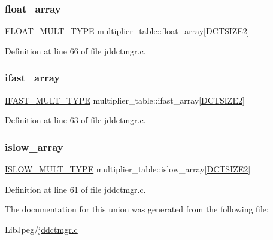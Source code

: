 \subsubsection{\texorpdfstring{float\_array}{float\_array}}
{\footnotesize\ttfamily \mbox{\hyperlink{jdct_8h_ac3f02a81c5cd0fca588c66be99b42691}{F\+L\+O\+A\+T\+\_\+\+M\+U\+L\+T\+\_\+\+T\+Y\+PE}} multiplier\+\_\+table\+::float\+\_\+array\mbox{[}\mbox{\hyperlink{jpeglib_8h_af89dff4200396563157d4a1e59da3bdf}{D\+C\+T\+S\+I\+Z\+E2}}\mbox{]}}



Definition at line 66 of file jddctmgr.\+c.

\mbox{\label{unionmultiplier__table_a815932c92e5d7cea970c6cddb5bbf6f1}} 
\subsubsection{\texorpdfstring{ifast\_array}{ifast\_array}}
{\footnotesize\ttfamily \mbox{\hyperlink{jdct_8h_a2ce5dea49d73b718b055db4d04b4a5a3}{I\+F\+A\+S\+T\+\_\+\+M\+U\+L\+T\+\_\+\+T\+Y\+PE}} multiplier\+\_\+table\+::ifast\+\_\+array\mbox{[}\mbox{\hyperlink{jpeglib_8h_af89dff4200396563157d4a1e59da3bdf}{D\+C\+T\+S\+I\+Z\+E2}}\mbox{]}}



Definition at line 63 of file jddctmgr.\+c.

\mbox{\label{unionmultiplier__table_a8585c9759405a74e7cbd4d6b3f8da073}} 
\subsubsection{\texorpdfstring{islow\_array}{islow\_array}}
{\footnotesize\ttfamily \mbox{\hyperlink{jdct_8h_a057ec4d475bf55bf8e28a146c8d9bce1}{I\+S\+L\+O\+W\+\_\+\+M\+U\+L\+T\+\_\+\+T\+Y\+PE}} multiplier\+\_\+table\+::islow\+\_\+array\mbox{[}\mbox{\hyperlink{jpeglib_8h_af89dff4200396563157d4a1e59da3bdf}{D\+C\+T\+S\+I\+Z\+E2}}\mbox{]}}



Definition at line 61 of file jddctmgr.\+c.



The documentation for this union was generated from the following file\+:\begin{DoxyCompactItemize}
\item 
Lib\+Jpeg/\mbox{\hyperlink{jddctmgr_8c}{jddctmgr.\+c}}\end{DoxyCompactItemize}
